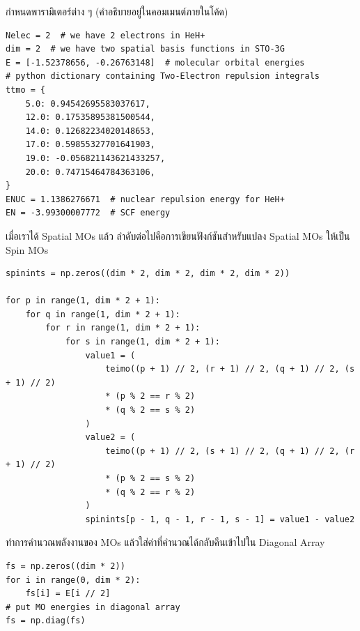 \noindent กำหนดพารามิเตอร์ต่าง ๆ (คำอธิบายอยู่ในคอมเมนต์ภายในโค้ด)

\vspace{5pt}

\begin{lstlisting}[style=MyPython]
Nelec = 2  # we have 2 electrons in HeH+
dim = 2  # we have two spatial basis functions in STO-3G
E = [-1.52378656, -0.26763148]  # molecular orbital energies
# python dictionary containing Two-Electron repulsion integrals
ttmo = {
    5.0: 0.94542695583037617,
    12.0: 0.17535895381500544,
    14.0: 0.12682234020148653,
    17.0: 0.59855327701641903,
    19.0: -0.056821143621433257,
    20.0: 0.74715464784363106,
}
ENUC = 1.1386276671  # nuclear repulsion energy for HeH+
EN = -3.99300007772  # SCF energy
\end{lstlisting}

\vspace{5pt}

\noindent เมื่อเราได้ Spatial MOs แล้ว ลำดับต่อไปคือการเขียนฟังก์ชันสำหรับแปลง Spatial MOs ให้เป็น Spin MOs

\vspace{5pt}

\begin{lstlisting}[style=MyPython]
spinints = np.zeros((dim * 2, dim * 2, dim * 2, dim * 2))

for p in range(1, dim * 2 + 1):
    for q in range(1, dim * 2 + 1):
        for r in range(1, dim * 2 + 1):
            for s in range(1, dim * 2 + 1):
                value1 = (
                    teimo((p + 1) // 2, (r + 1) // 2, (q + 1) // 2, (s + 1) // 2)
                    * (p % 2 == r % 2)
                    * (q % 2 == s % 2)
                )
                value2 = (
                    teimo((p + 1) // 2, (s + 1) // 2, (q + 1) // 2, (r + 1) // 2)
                    * (p % 2 == s % 2)
                    * (q % 2 == r % 2)
                )
                spinints[p - 1, q - 1, r - 1, s - 1] = value1 - value2
\end{lstlisting}

\vspace{5pt}

\noindent ทำการคำนวณพลังงานของ MOs แล้วใส่ค่าที่คำนวณได้กลับคืนเข้าไปใน Diagonal Array

\vspace{5pt}

\begin{lstlisting}[style=MyPython]
fs = np.zeros((dim * 2))
for i in range(0, dim * 2):
    fs[i] = E[i // 2]
# put MO energies in diagonal array
fs = np.diag(fs)
\end{lstlisting}

